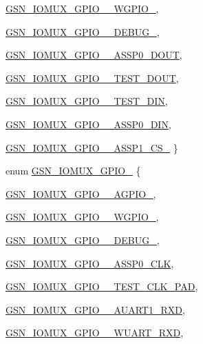 \begin{DoxyCompactItemize}
\hyperlink{a00519_a75355127354ab0ecdc012bd92dab342fad267d607e548727cf073d9ab1915c43f}{GSN\_\-IOMUX\_\-GPIO\_\_\-WGPIO\_}, 
\par
\hyperlink{a00519_a75355127354ab0ecdc012bd92dab342faf7c1c20aa00d7cf0145aa8971a5e5f22}{GSN\_\-IOMUX\_\-GPIO\_\_\-DEBUG\_}, 
\par
\hyperlink{a00519_a75355127354ab0ecdc012bd92dab342fa747081919eaf5510cb8ec603747821f7}{GSN\_\-IOMUX\_\-GPIO\_\_\-ASSP0\_\-DOUT}, 
\par
\hyperlink{a00519_a75355127354ab0ecdc012bd92dab342faca8bb2bec55045fefa3dffc6e1cd6a3f}{GSN\_\-IOMUX\_\-GPIO\_\_\-TEST\_\-DOUT}, 
\par
\hyperlink{a00519_a75355127354ab0ecdc012bd92dab342fae941ffb9a38f4a7d9c6c223435d80a13}{GSN\_\-IOMUX\_\-GPIO\_\_\-TEST\_\-DIN}, 
\par
\hyperlink{a00519_a75355127354ab0ecdc012bd92dab342fa2137255db7a6b7ecedcdd3ae37b14abf}{GSN\_\-IOMUX\_\-GPIO\_\_\-ASSP0\_\-DIN}, 
\par
\hyperlink{a00519_a75355127354ab0ecdc012bd92dab342fa766630f84c8b9ed0dfa0e71d91188721}{GSN\_\-IOMUX\_\-GPIO\_\_\-ASSP1\_\-CS\_}
 \}
\item 
enum \hyperlink{a00519_a88ad3958e476541f6f56ac2adb3e6218}{GSN\_\-IOMUX\_\-GPIO\_} \{ \par
\hyperlink{a00519_a88ad3958e476541f6f56ac2adb3e6218a71bc3d5eb46ae1a18459a0cb5bfd22f8}{GSN\_\-IOMUX\_\-GPIO\_\_\-AGPIO\_}, 
\par
\hyperlink{a00519_a88ad3958e476541f6f56ac2adb3e6218a1fa527e301b49d88bb603954fd7ac5ef}{GSN\_\-IOMUX\_\-GPIO\_\_\-WGPIO\_}, 
\par
\hyperlink{a00519_a88ad3958e476541f6f56ac2adb3e6218a2a74d7a6b4fd0067f0bd7a07daa36e12}{GSN\_\-IOMUX\_\-GPIO\_\_\-DEBUG\_}, 
\par
\hyperlink{a00519_a88ad3958e476541f6f56ac2adb3e6218a4cd7bd8e68086b0aa9343db0e7b997a4}{GSN\_\-IOMUX\_\-GPIO\_\_\-ASSP0\_\-CLK}, 
\par
\hyperlink{a00519_a88ad3958e476541f6f56ac2adb3e6218ab4314390c01510b2749465356ce5e192}{GSN\_\-IOMUX\_\-GPIO\_\_\-TEST\_\-CLK\_\-PAD}, 
\par
\hyperlink{a00519_a88ad3958e476541f6f56ac2adb3e6218a9a6941e447dd87808f1696fd0182703a}{GSN\_\-IOMUX\_\-GPIO\_\_\-AUART1\_\-RXD}, 
\par
\hyperlink{a00519_a88ad3958e476541f6f56ac2adb3e6218a265c373ecdf7ce54082063c9a7f2a915}{GSN\_\-IOMUX\_\-GPIO\_\_\-WUART\_\-RXD}, 
\par

\end{DoxyCompactItemize}
